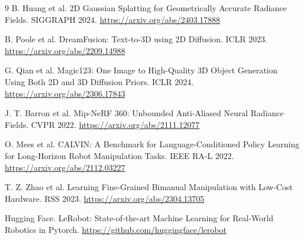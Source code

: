 \documentclass[10pt,a4paper,UTF8,fontset=windows]{ctexart}
\begin{document}
\begin{thebibliography}{9}
\small
{}
B. Huang et al.
\newblock 2D Gaussian Splatting for Geometrically Accurate Radiance Fields.
\newblock SIGGRAPH 2024. \url{https://arxiv.org/abs/2403.17888}

B. Poole et al.
\newblock DreamFusion: Text-to-3D using 2D Diffusion.
\newblock ICLR 2023. \url{https://arxiv.org/abs/2209.14988}

G. Qian et al.
\newblock Magic123: One Image to High-Quality 3D Object Generation Using Both 2D and 3D Diffusion Priors.
\newblock ICLR 2024. \url{https://arxiv.org/abs/2306.17843}

J. T. Barron et al.
\newblock Mip-NeRF 360: Unbounded Anti-Aliased Neural Radiance Fields.
\newblock CVPR 2022. \url{https://arxiv.org/abs/2111.12077}

O. Mees et al.
\newblock CALVIN: A Benchmark for Language-Conditioned Policy Learning for Long-Horizon Robot Manipulation Tasks.
\newblock IEEE RA-L 2022. \url{https://arxiv.org/abs/2112.03227}

T. Z. Zhao et al.
\newblock Learning Fine-Grained Bimanual Manipulation with Low-Cost Hardware.
\newblock RSS 2023. \url{https://arxiv.org/abs/2304.13705}

Hugging Face.
\newblock LeRobot: State-of-the-art Machine Learning for Real-World Robotics in Pytorch.
\newblock \url{https://github.com/huggingface/lerobot}
\end{thebibliography}
\end{document}
